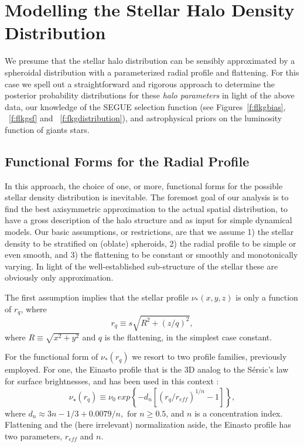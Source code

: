 \documentclass[12pt,preprint]{aastex}
\begin{document}
\section{Modelling the Stellar Halo Density Distribution}\label{sec:Modelling}

We presume that the stellar halo distribution can be sensibly approximated by a spheroidal distribution with a parameterized radial profile and flattening. For this case we spell out a straightforward and rigorous approach to determine the posterior probability distributions for these \textit{halo parameters} in light of the above data, our knowledge of the SEGUE selection function (see Figures~\ref{f:flkgbias}, ~\ref{f:flkgsf} and ~\ref{f:fkgdistribution}), and astrophysical priors on the luminosity function of giants stars. 

\subsection{Functional Forms for the Radial Profile}\label{sec:RadialProfileFunctions}

In this approach, the choice of one, or more, functional forms for the possible stellar density distribution is inevitable. The foremost goal of our analysis is to find the best axisymmetric approximation to the actual spatial distribution, to have a gross description of the halo structure and as input for simple dynamical models. Our basic assumptions, or restrictions, are that we assume 1) the stellar density to be stratified on (oblate) spheroids, 2) the radial profile to be simple or even smooth, and 3) the flattening to be constant or smoothly and monotonically varying. In light of the well-established sub-structure of the stellar these are obviously only approximation. 

The first assumption implies that the stellar profile $\nu_*(x,y,z)$ is only a function of $r_q$,
where 
\begin{equation}
r_q\equiv s\sqrt{R^2 + (z/q)^2},
\end{equation}
where $R\equiv \sqrt{x^2+y^2}$ and $q$ is the flattening, in the simplest case constant.

For the functional form of $\nu_*(r_q)$ we resort to two profile families, previously employed.
For one, the Einasto profile \citep{Einasto1989} that is the 3D analog to the S{\'e}rsic's law\citep{Sersic1963} for surface brightnesses, and has been used in this context \citep{Sesar2011,Deason2011,Merritt2006} :
\begin{equation}
\nu_{\star}(r_q) \equiv \nu_0~exp\left\{-d_n\left[\left(r_q/r_{eff}\right )^{1/n}-1\right ]\right\},
\end{equation}
where $ d_n \approx 3n-1/3+0.0079/n, \mbox{ for } n \ge 0.5 \nonumber$,
and $n$ is a concentration index. Flattening and the (here irrelevant) normalization aside, the Einasto profile has two parameters, $r_{eff}$ and $n$.
\end{document}
